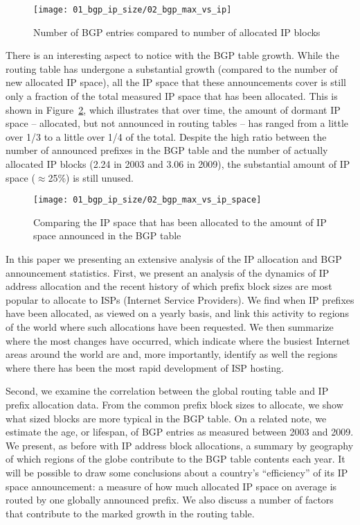 \begin{figure}[htbp]
	\centering
		\texttt{[image: 01\_bgp\_ip\_size/02\_bgp\_max\_vs\_ip]}
	\caption{Number of BGP entries compared to number of allocated IP blocks}
	\label{fig:BGP vs RIR}
\end{figure}

There is an interesting aspect to notice with the BGP table growth. While the
routing table has undergone a substantial growth (compared to the number of
new allocated IP space), all the IP space that these announcements cover is
still only a fraction of the total measured IP space that has been allocated.
This is shown in Figure~\ref{fig:BGP vs RIR space}, which illustrates that
over time, the amount of dormant IP space -- allocated, but not announced in
routing tables -- has ranged from a little over 1/3 to a little over 1/4 of
the total. Despite the high ratio between the number of announced prefixes in
the BGP table and the number of actually allocated IP blocks (2.24 in 2003 and
3.06 in 2009), the substantial amount of IP space ($\approx$25\%) is still unused.

\begin{figure}[htbp]
	\centering
\texttt{[image: 01\_bgp\_ip\_size/02\_bgp\_max\_vs\_ip\_space]}
	\caption{Comparing the IP space that has been allocated to the amount of IP
			 space announced in the BGP table}
	\label{fig:BGP vs RIR space}
\end{figure}


% 
%

In this paper we presenting an extensive analysis of the IP allocation and BGP
announcement statistics. First, we present an analysis of the dynamics of IP
address allocation and the recent history of which prefix block sizes are most
popular to allocate to ISPs (Internet Service Providers). We find when IP
prefixes have been allocated, as viewed on a yearly basis, and link this
activity to regions of the world where such allocations have been requested.
We then summarize where the most changes have occurred, which indicate where
the busiest Internet areas around the world are and, more importantly,
identify as well the regions where there has been the most rapid development
of ISP hosting.

Second, we examine the correlation between the global routing table and IP
prefix allocation data. From the common prefix block sizes to allocate, we
show what sized blocks are more typical in the BGP table. On a related note,
we estimate the age, or lifespan, of BGP entries as measured between 2003 and
2009. We present, as before with IP address block allocations, a summary by
geography of which regions of the globe contribute to the BGP table contents
each year. It will be possible to draw some conclusions about a country's
``efficiency'' of its IP space announcement: a measure of how much allocated
IP space on average is routed by one globally announced prefix. We also
discuss a number of factors that contribute to the marked growth in the
routing table.

